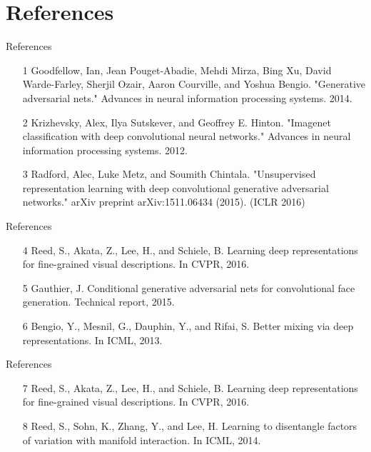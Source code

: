\documentclass{beamer}
\begin{document}
\section{References}
\begin{frame}{References}
\begin{enumerate}
\item[1] Goodfellow, Ian, Jean Pouget-Abadie, Mehdi Mirza, Bing Xu, David Warde-Farley, Sherjil Ozair, Aaron Courville, and Yoshua Bengio. "Generative adversarial nets." Advances in neural information processing systems. 2014.

\item[2] Krizhevsky, Alex, Ilya Sutskever, and Geoffrey E. Hinton. "Imagenet classification with deep convolutional neural networks." Advances in neural information processing systems. 2012.

\item[3] Radford, Alec, Luke Metz, and Soumith Chintala. "Unsupervised representation learning with deep convolutional generative adversarial networks." arXiv preprint arXiv:1511.06434 (2015). (ICLR 2016)
\end{enumerate}
\end{frame}

%
\begin{frame}{References}
\begin{enumerate}
\item[4] Reed, S., Akata, Z., Lee, H., and Schiele, B. Learning deep representations for fine-grained visual descriptions. In CVPR, 2016.

\item[5] Gauthier, J. Conditional generative adversarial nets for convolutional face generation. Technical report, 2015.

\item[6] Bengio, Y., Mesnil, G., Dauphin, Y., and Rifai, S. Better mixing via deep representations. In ICML, 2013.
\end{enumerate}
\end{frame}

%
\begin{frame}{References}
\begin{enumerate}
\item[7] Reed, S., Akata, Z., Lee, H., and Schiele, B. Learning deep representations for fine-grained visual descriptions. In CVPR, 2016.

\item[8] Reed, S., Sohn, K., Zhang, Y., and Lee, H. Learning to disentangle factors of variation with manifold interaction. In ICML, 2014.
\end{enumerate}
\end{frame}
\end{document}
